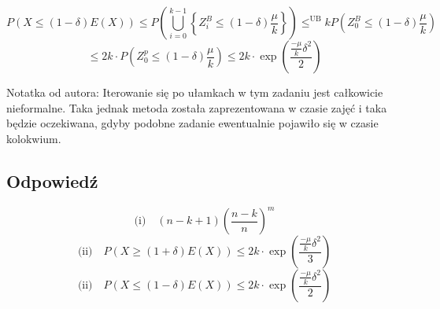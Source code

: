 \[
	P(X \leqslant (1-\delta)E(X))
	\leqslant P\left(\bigcup_{i=0}^{k-1}
	\left\{Z_i^B \leqslant (1-\delta)\frac{\mu}k \right\}\right)
	\leqslant^{\text{UB}}
	k P\left(Z_0^{B} \leqslant (1-\delta)\frac{\mu}k\right)
\]
\[
	\leqslant 2k\cdot P\left(Z_0^{p} \leqslant (1-\delta)\frac{\mu}k\right)
	\leqslant 2k\cdot \exp\left(\frac{\frac{-\mu}{k}\delta^2}{2}\right)
\]

{\tiny Notatka od autora:
Iterowanie się po ułamkach w tym zadaniu jest całkowicie nieformalne.
Taka jednak metoda została zaprezentowana w czasie zajęć
i taka będzie oczekiwana, gdyby podobne zadanie ewentualnie pojawiło
się w czasie kolokwium.}

\subsection*{Odpowiedź}
\[
	\text{(i)}\quad \boxed{(n-k+1)\left(\frac{n-k}{n}\right)^{m}}
\]
\[
	\text{(ii)}\quad \boxed{
		P(X \geqslant (1+\delta)E(X))
		\leqslant 2k\cdot \exp\left(\frac{\frac{-\mu}{k}\delta^2}{3}\right)
	}
\]
\[
	\text{(ii)}\quad \boxed{
		P(X \leqslant (1-\delta)E(X))
		\leqslant 2k\cdot \exp\left(\frac{\frac{-\mu}{k}\delta^2}{2}\right)
	}
\]
